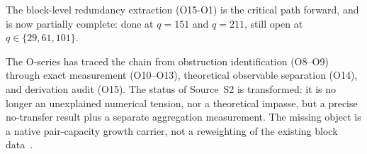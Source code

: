 \documentclass[11pt,a4paper]{article}
\begin{document}
The block-level redundancy extraction (O15-O1) is the critical path
forward, and is now partially complete: done at $q=151$ and $q=211$,
still open at $q\in\{29,61,101\}$.

The O-series has traced the chain from obstruction identification
(O8--O9) through exact measurement (O10--O13), theoretical
observable separation (O14), and derivation audit (O15).
The status of Source~S2 is transformed:
it is no longer an unexplained numerical tension,
nor a theoretical impasse,
but a precise no-transfer result plus a separate aggregation measurement.
The missing object is a native pair-capacity growth carrier, not a reweighting of the existing
block data~\cite{Beau2026sgn}.


\begingroup
\raggedright

\endgroup
\end{document}
